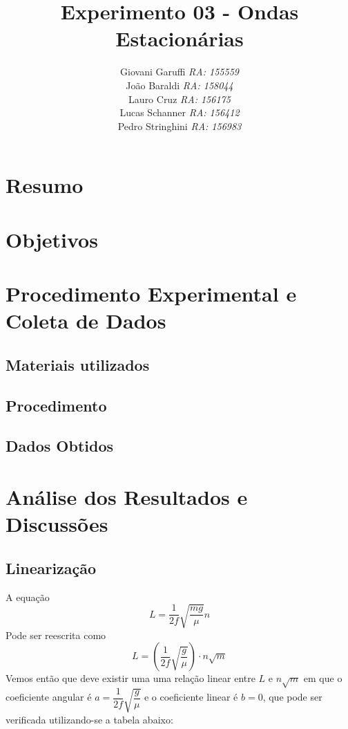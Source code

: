 \documentclass[12pt,a4paper]{article}
\begin{document}
\title{\vspace{70mm}\Huge Experimento 03 - Ondas Estacionárias}
\author{ Giovani Garuffi\qquad\hfill
		\textit {RA: 155559}\protect\\
		João Baraldi\hfill
		\textit{RA: 158044}\protect\\
		Lauro Cruz\hfill
		\textit{RA: 156175}\protect\\
		Lucas Schanner\hfill
		\textit{RA: 156412}\protect\\
		Pedro Stringhini\hfill
		\textit {RA: 156983}								
		}
\maketitle
\newpage
\section{Resumo}

\section{Objetivos}


\section{Procedimento Experimental e Coleta de Dados}

\subsection{Materiais utilizados}


\subsection{Procedimento}




\subsection{Dados Obtidos}







\section{Análise dos Resultados e Discussões}
\subsection{Linearização}
A equação
$$ L = \dfrac{1}{2f} \sqrt{\dfrac{mg}{\mu}} n $$
Pode ser reescrita como
$$ L = (\dfrac{1}{2f} \sqrt{\dfrac{g}{\mu}}) \cdot n\sqrt{m} $$
Vemos então que deve existir uma uma relação linear entre $L$ e $n\sqrt{m}$ em que o coeficiente angular é $a = \dfrac{1}{2f} \sqrt{\dfrac{g}{\mu}}$ e o coeficiente linear é $b = 0$, que pode ser verificada utilizando-se a tabela abaixo:
\end{document}

